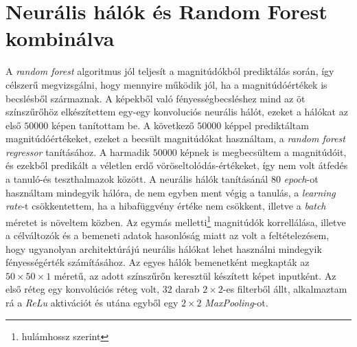 \documentclass[12pt,letterpaper,twoside,openright]{book}
\begin{document}
\section{Neurális hálók és Random Forest kombinálva}
A \textit{random forest} algoritmus jól teljesít a magnitúdókból prediktálás során, így célszerű megvizsgálni, hogy mennyire működik jól, ha a magnitúdóértékek is becslésből származnak. A képekből való fényességbecsléshez mind az öt színszűrőhöz elkészítettem egy-egy konvoluciós neurális hálót, ezeket a hálókat az első $\num{50000}$ képen tanítottam be. A következő $\num{50000}$ képpel prediktáltam magnitúdóértékeket, ezeket a becsült magnitúdókat használtam, a \textit{random forest regressor} tanításához. A harmadik $\num{50000}$ képnek is megbecsültem a magnitúdóit, és ezekből predikált a véletlen erdő vöröseltolódás-értékeket, így nem volt átfedés a tanuló-és teszthalmazok között. A neurális hálók tanításánál 80 \textit{epoch}-ot használtam mindegyik hálóra, de nem egyben ment végig a tanulás, a \textit{learning rate}-t csökkentettem, ha a hibafüggvény értéke nem csökkent, illetve a \textit{batch} méretet is növeltem közben. Az egymás melletti\footnote{hulámhossz szerint} magnitúdók korrellálása, illetve a célváltozók és a bemeneti adatok hasonlóság miatt az volt a feltételezésem, hogy ugyanolyan architektúrájú neurális hálókat lehet használni mindegyik fényességérték számításához.
\newline\indent
Az egyes hálók bemenetként megkapták az $50\times 50\times 1$ méretű, az adott színszűrőn keresztül készített képet inputként. Az első réteg egy konvolúciós réteg volt, $32$ darab $2\times 2$-es filterből állt, alkalmaztam rá a \textit{ReLu} aktivációt és utána egyből egy $2\times 2$ \textit{MaxPooling}-ot.
\end{document}
